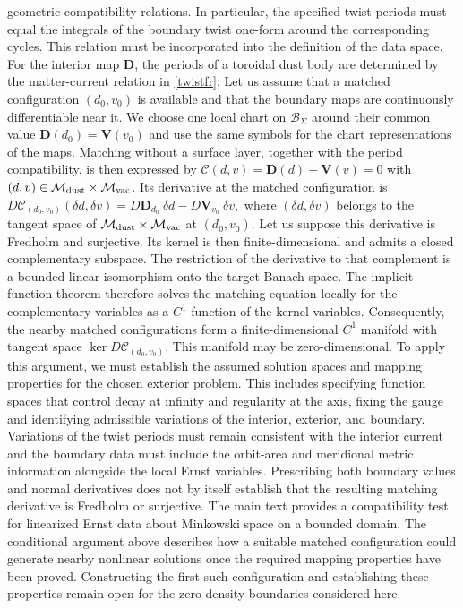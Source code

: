 \documentclass[amsmath,amsfonts,amssymb,aps,pra,superscriptaddress,10pt]{revtex4-2}
\numberwithin{equation}{section}
\theoremstyle{plain}
\theoremstyle{definition}
\theoremstyle{remark}
\theoremstyle{definition}
\begin{document}
geometric compatibility relations. In particular, the specified twist periods must equal the integrals of the boundary twist one-form around the corresponding cycles. This relation must be incorporated into the definition of the data space. For the interior map $\mathbf{D}$, the periods of a toroidal dust body are determined by the matter-current relation in \eqref{twistfr}. Let us assume that a matched configuration $(d_0,v_0)$ is available and that the boundary maps are continuously differentiable near it. We choose one local chart on $\mathcal{B}_\Sigma$ around their common value $\mathbf{D}(d_0)=\mathbf{V}(v_0)$ and use the same symbols for the chart representations of the maps. Matching without a surface layer, together with the period compatibility, is then expressed by $\mathcal{C}(d,v)=\mathbf{D}(d)-\mathbf{V}(v)=0$ with $(d,v)\in\mathcal{M}_{\rm{dust}}\times\mathcal{M}_{\rm{vac}}$. Its derivative at the matched configuration is $D\mathcal{C}_{(d_0,v_0)}(\delta d,\delta v)=D\mathbf{D}_{d_0}~\delta d-D\mathbf{V}_{v_0}~\delta v,$ where $(\delta d,\delta v)$ belongs to the tangent space of $\mathcal{M}_{\rm{dust}}\times\mathcal{M}_{\rm{vac}}$ at $(d_0,v_0)$. Let us suppose this derivative is Fredholm and surjective. Its kernel is then finite-dimensional and admits a closed complementary subspace. The restriction of the derivative to that complement is a bounded linear isomorphism onto the target Banach space. The implicit-function theorem therefore solves the matching equation locally for the complementary variables as a $C^1$ function of the kernel variables. Consequently, the nearby matched configurations form a finite-dimensional $C^1$ manifold with tangent space $\ker D\mathcal{C}_{(d_0,v_0)}$. This manifold may be zero-dimensional. To apply this argument, we must establish the assumed solution spaces and mapping properties for the chosen exterior problem. This includes specifying function spaces that control decay at infinity and regularity at the axis, fixing the gauge and identifying admissible variations of the interior, exterior, and boundary. Variations of the twist periods must remain consistent with the interior current and the boundary data must include the orbit-area and meridional metric information alongside the local Ernst variables. Prescribing both boundary values and normal derivatives does not by itself establish that the resulting matching derivative is Fredholm or surjective. The main text provides a compatibility test for linearized Ernst data about Minkowski space on a bounded domain. The conditional argument above describes how a suitable matched configuration could generate nearby nonlinear solutions once the required mapping properties have been proved. Constructing the first such configuration and establishing these properties remain open for the zero-density boundaries considered here.
\end{document}
